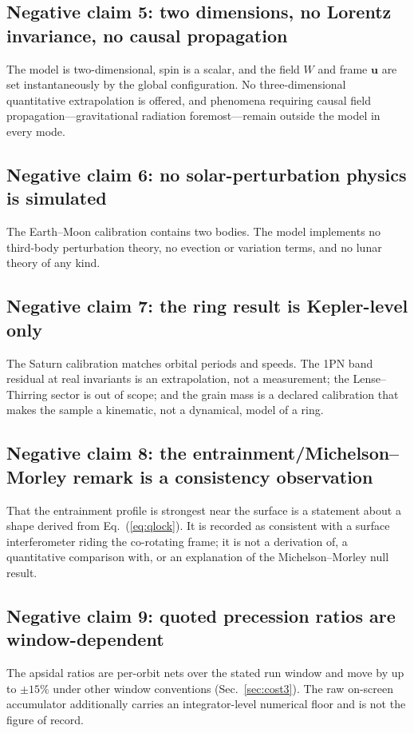 \documentclass[aps,reprint,amsmath,amssymb,nofootinbib,superscriptaddress,floatfix]{revtex4-2}
\begin{document}
\subsection{Negative claim 5: two dimensions, no Lorentz invariance, no
  causal propagation}
The model is two-dimensional, spin is a scalar, and the field $W$ and
frame $\bm u$ are set instantaneously by the global configuration.
No three-dimensional quantitative extrapolation is offered, and
phenomena requiring causal field propagation---gravitational radiation
foremost---remain outside the model in every mode.

\subsection{Negative claim 6: no solar-perturbation physics is
  simulated}
The Earth--Moon calibration contains two bodies.
The model implements no third-body perturbation theory, no evection or
variation terms, and no lunar theory of any kind.

\subsection{Negative claim 7: the ring result is Kepler-level only}
The Saturn calibration matches orbital periods and speeds.
The 1PN band residual at real invariants is an extrapolation, not a
measurement; the Lense--Thirring sector is out of scope; and the grain
mass is a declared calibration that makes the sample a kinematic, not a
dynamical, model of a ring.

\subsection{Negative claim 8: the entrainment/Michelson--Morley remark
  is a consistency observation}
That the entrainment profile is strongest near the surface is a
statement about a shape derived from Eq.~(\ref{eq:qlock}).
It is recorded as consistent with a surface interferometer riding the
co-rotating frame; it is not a derivation of, a quantitative comparison
with, or an explanation of the Michelson--Morley null result.

\subsection{Negative claim 9: quoted precession ratios are
  window-dependent}
The apsidal ratios are per-orbit nets over the stated run window and
move by up to $\pm15\%$ under other window conventions
(Sec.~\ref{sec:cost3}).
The raw on-screen accumulator additionally carries an
integrator-level numerical floor and is not the figure of record.
\end{document}

